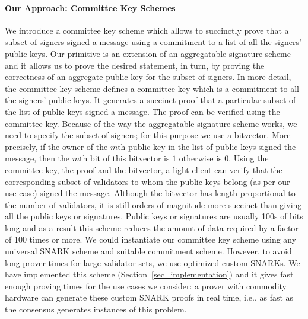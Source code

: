 \paragraph{Our Approach: Committee Key Schemes} We introduce a committee key scheme which allows to succinctly prove that a subset of signers 
signed a message using a commitment to a list of all the signers' public keys. Our primitive is an extension of an aggregatable signature scheme and 
it allows us to prove the desired statement, in turn, by proving the correctness of an aggregate public key for the subset of signers. 
In more detail, the committee key scheme defines a committee key which is a commitment to all the signers' public keys. It generates a succinct proof that a particular subset of the list of public keys signed a message. The proof can be verified using the committee key. 
Because of the way the aggregatable signature scheme works, we need to specify the subset of signers; for this purpose we use a bitvector. 
More precisely, if the owner of the $m$th public key in the list of public keys signed the message, then the $m$th bit of this bitvector is $1$ otherwise is $0$.
Using the committee key, the proof and the bitvector, a light client can verify that the corresponding subset of validators to whom the 
public keys belong (as per our use case) signed the message. Although the bitvector has length proportional to the number of validators, it is still orders of magnitude 
more succinct than giving all the public keys or signatures. Public keys or signatures are usually 100s of bits long and as a result this scheme reduces the amount of 
data required by a factor of 100 times or more. We could instantiate our committee key scheme using any universal SNARK scheme and suitable commitment scheme. 
However, to avoid long prover times for large validator sets, we use optimized custom SNARKs. We have implemented this scheme 
(Section~\ref{sec_implementation}) and it gives fast enough proving times for the use cases we consider: a prover with 
commodity hardware can generate these custom SNARK proofs in real time, i.e., as fast as the consensus generates instances of this problem.

\vspace{-0.2cm}
